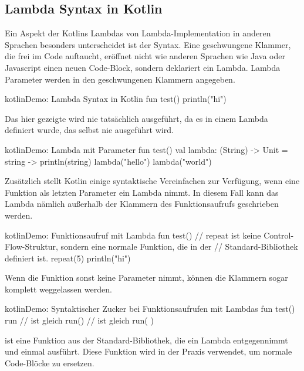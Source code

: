 \subsection{Lambda Syntax in Kotlin}
Ein Aspekt der Kotlins Lambdas von Lambda-Implementation in anderen Sprachen besonders unterscheidet ist der Syntax.
Eine geschwungene Klammer, die frei im Code auftaucht, eröffnet nicht wie anderen Sprachen wie \zB Java oder Javascript
einen neuen Code-Block, sondern deklariert ein Lambda.
Lambda Parameter werden in den geschwungenen Klammern angegeben.

\begin{codeBlock}{kotlin}{Demo: Lambda Syntax in Kotlin}
fun test() {
    {
        println("hi")
    }
}
\end{codeBlock}

Das hier gezeigte  wird nie tatsächlich ausgeführt, da es in einem Lambda
definiert wurde, das selbst nie ausgeführt wird.

\begin{codeBlock}{kotlin}{Demo: Lambda mit Parameter}
fun test() {
    val lambda: (String) -> Unit = { string -> println(string) }
    lambda("hello")
    lambda("world")
}
\end{codeBlock}

Zusätzlich stellt Kotlin einige syntaktische Vereinfachen zur Verfügung, wenn eine Funktion als letzten Parameter
ein Lambda nimmt.
In diesem Fall kann das Lambda nämlich außerhalb der Klammern des Funktionsaufrufs geschrieben werden.

\begin{codeBlock}{kotlin}{Demo: Funktionsaufruf mit Lambda}
fun test() {
    // repeat ist keine Control-Flow-Struktur, sondern eine normale Funktion, die in der
    // Standard-Bibliothek definiert ist.
    repeat(5) {
        println("hi")
    }
}
\end{codeBlock}

Wenn die Funktion sonst keine Parameter nimmt, können die Klammern sogar komplett weggelassen werden.

\begin{codeBlock}{kotlin}{Demo: Syntaktischer Zucker bei Funktionsaufrufen mit Lambdas}
fun test() {
    run {
    }
    // ist gleich
    run() {
    }
    // ist gleich
    run({ })
}
\end{codeBlock}

 ist eine Funktion aus der Standard-Bibliothek, die ein Lambda entgegennimmt und einmal ausführt.
Diese Funktion wird in der Praxis verwendet, um normale Code-Blöcke zu ersetzen.


